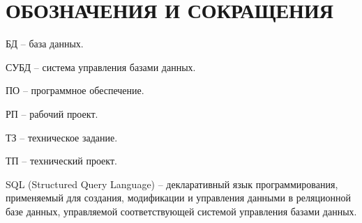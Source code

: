 \section*{ОБОЗНАЧЕНИЯ И СОКРАЩЕНИЯ}

БД -- база данных.

СУБД -- система управления базами данных.

ПО -- программное обеспечение.

РП -- рабочий проект.

ТЗ -- техническое задание.

ТП -- технический проект.

SQL (Structured Query Language) --  декларативный язык программирования, применяемый для создания, модификации и управления данными в реляционной базе данных, управляемой соответствующей системой управления базами данных.